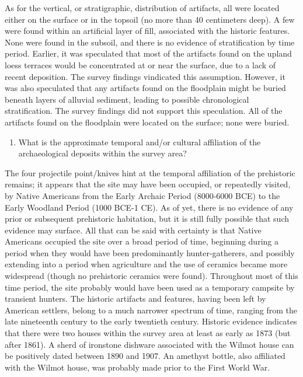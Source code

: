 As for the vertical, or stratigraphic, distribution of artifacts, all were located either on the surface or in the topsoil (no more than 40 centimeters deep). A few were found within an artificial layer of fill, associated with the historic features. None were found in the subsoil, and there is no evidence of stratification by time period. Earlier, it was speculated that most of the artifacts found on the upland loess terraces would be concentrated at or near the surface, due to a lack of recent deposition. The survey findings vindicated this assumption. However, it was also speculated that any artifacts found on the floodplain might be buried beneath layers of alluvial sediment, leading to possible chronological stratification. The survey findings did not support this speculation. All of the artifacts found on the floodplain were located on the surface; none were buried.

\begin{enumerate}[resume]
	\item What is the approximate temporal and/or cultural affiliation of the archaeological deposits within the survey area?
\end{enumerate}

The four projectile point/knives hint at the temporal affiliation of the prehistoric remains; it appears that the site may have been occupied, or repeatedly visited, by Native Americans from the Early Archaic Period (8000-6000 BCE) to the Early Woodland Period (1000 BCE-1 CE). As of yet, there is no evidence of any prior or subsequent prehistoric habitation, but it is still fully possible that such evidence may surface. All that can be said with certainty is that Native Americans occupied the site over a broad period of time, beginning during a period when they would have been predominantly hunter-gatherers, and possibly extending into a period when agriculture and the use of ceramics became more widespread (though no prehistoric ceramics were found). Throughout most of this time period, the site probably would have been used as a temporary campsite by transient hunters.
The historic artifacts and features, having been left by American settlers, belong to a much narrower spectrum of time, ranging from the late nineteenth century to the early twentieth century. Historic evidence indicates that there were two houses within the survey area at least as early as 1873 (but after 1861). A sherd of ironstone dishware associated with the Wilmot house can be positively dated between 1890 and 1907. An amethyst bottle, also affiliated with the Wilmot house, was probably made prior to the First World War.

